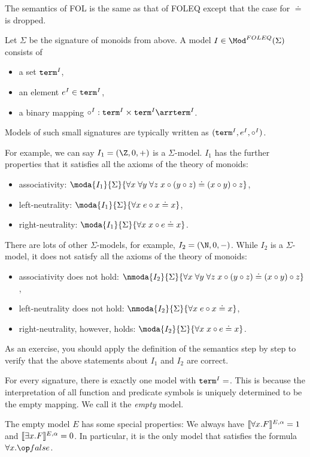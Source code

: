 The semantics of FOL is the same as that of FOLEQ except that the case for $\doteq$ is dropped.

\begin{example}[Monoids]
Let $\Sigma$ be the signature of monoids from above. A model $I\in\Mod^{FOLEQ}(\Sigma)$ consists of
\begin{itemize}
\item a set $\mathtt{term}^I$,
\item an element $e^I\in \mathtt{term}^I$,
\item a binary mapping $\circ^I:\univ^I\times \univ^I\arr \univ^I$.
\end{itemize}
Models of such small signatures are typically written as $(\mathtt{term}^I, e^I, \circ^I)$.

For example, we can say $I_1=(\Z, 0, +)$ is a $\Sigma$-model. $I_1$ has the further properties that it satisfies all the axioms of the theory of monoids:
\begin{itemize}
\item associativity: $\moda{I_1}{\Sigma}{\forall x\;\forall y\;\forall z\;x\circ (y\circ z) \doteq (x\circ y)\circ z}$,
\item left-neutrality: $\moda{I_1}{\Sigma}{\forall x\;e\circ x \doteq x}$,
\item right-neutrality: $\moda{I_1}{\Sigma}{\forall x\;x\circ e \doteq x}$.
\end{itemize}

There are lots of other $\Sigma$-models, for example, $I_2=(\N,0,-)$. While $I_2$ is a $\Sigma$-model, it does not satisfy all the axioms of the theory of monoids:
\begin{itemize}
\item associativity does not hold: $\nmoda{I_2}{\Sigma}{\forall x\;\forall y\;\forall z\;x\circ (y\circ z) \doteq (x\circ y)\circ z}$,
\item left-neutrality does not hold: $\nmoda{I_2}{\Sigma}{\forall x\;e\circ x \doteq x}$,
\item right-neutrality, however, holds: $\moda{I_2}{\Sigma}{\forall x\;x\circ e \doteq x}$.
\end{itemize}

As an exercise, you should apply the definition of the semantics step by step to verify that the above statements about $I_1$ and $I_2$ are correct.
\end{example}

\begin{example}\label{ex:mod:empty}
For every signature, there is exactly one model with $\univ^I=\empty$.
This is because the interpretation of all function and predicate symbols is uniquely determined to be the empty mapping.
We call it the \emph{empty} model.

The empty model $E$ has some special properties: We always have
$\llbracket \forall x.F\rrbracket^{E,\alpha}=1$
and 
$\llbracket \exists x.F\rrbracket^{E,\alpha}=0$.
In particular, it is the only model that satisfies the formula $\forall x.\false$.
\end{example}

